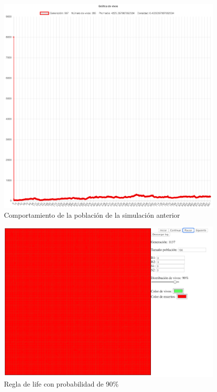 	\begin{figure}[H]
		\begin{center}
			\includegraphics[scale=.24]{GOL/img/life80-2.png}
			\caption{Comportamiento de la población de la simulación anterior}
			\label{fig:gol5}
		\end{center}
	\end{figure}

	\begin{figure}[H]
		\begin{center}
			\includegraphics[scale=.3]{GOL/img/life90-1.png}
			\caption{Regla de life con probabilidad de 90\%}
			\label{fig:gol5}
		\end{center}
	\end{figure}


